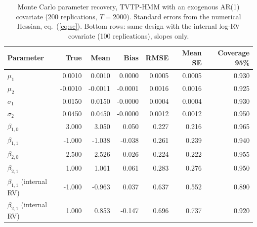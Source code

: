 \begin{table}[t]\centering\small
\caption{Monte Carlo parameter recovery, TVTP-HMM with an exogenous AR(1) covariate (200 replications, $T=2000$). Standard errors from the numerical Hessian, eq.~(\ref{eq:se}). Bottom rows: same design with the internal log-RV covariate (100 replications), slopes only.}\label{tab:mc}
\begin{tabular}{lrrrrrr}\toprule Parameter & True & Mean & Bias & RMSE & Mean SE & Coverage 95\% \\ \midrule
$\mu_1$ & 0.0010 & 0.0010 & 0.0000 & 0.0005 & 0.0005 & 0.930 \\
$\mu_2$ & -0.0010 & -0.0011 & -0.0001 & 0.0016 & 0.0016 & 0.925 \\
$\sigma_1$ & 0.0150 & 0.0150 & -0.0000 & 0.0004 & 0.0004 & 0.930 \\
$\sigma_2$ & 0.0450 & 0.0450 & -0.0000 & 0.0012 & 0.0012 & 0.950 \\
$\beta_{1,0}$ & 3.000 & 3.050 & 0.050 & 0.227 & 0.216 & 0.965 \\
$\beta_{1,1}$ & -1.000 & -1.038 & -0.038 & 0.261 & 0.239 & 0.940 \\
$\beta_{2,0}$ & 2.500 & 2.526 & 0.026 & 0.224 & 0.222 & 0.955 \\
$\beta_{2,1}$ & 1.000 & 1.061 & 0.061 & 0.283 & 0.276 & 0.950 \\
\midrule
$\beta_{1,1}$ (internal RV) & -1.000 & -0.963 & 0.037 & 0.637 & 0.552 & 0.890 \\
$\beta_{2,1}$ (internal RV) & 1.000 & 0.853 & -0.147 & 0.696 & 0.737 & 0.920 \\
\bottomrule\end{tabular}\end{table}
